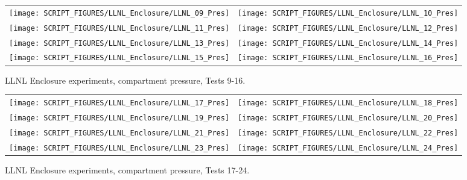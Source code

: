 \begin{figure}[p]
\begin{tabular*}{\textwidth}{l@{\extracolsep{\fill}}r}
\texttt{[image: SCRIPT\_FIGURES/LLNL\_Enclosure/LLNL\_09\_Pres]} &
\texttt{[image: SCRIPT\_FIGURES/LLNL\_Enclosure/LLNL\_10\_Pres]} \\
\texttt{[image: SCRIPT\_FIGURES/LLNL\_Enclosure/LLNL\_11\_Pres]} &
\texttt{[image: SCRIPT\_FIGURES/LLNL\_Enclosure/LLNL\_12\_Pres]} \\
\texttt{[image: SCRIPT\_FIGURES/LLNL\_Enclosure/LLNL\_13\_Pres]} &
\texttt{[image: SCRIPT\_FIGURES/LLNL\_Enclosure/LLNL\_14\_Pres]} \\
\texttt{[image: SCRIPT\_FIGURES/LLNL\_Enclosure/LLNL\_15\_Pres]} &
\texttt{[image: SCRIPT\_FIGURES/LLNL\_Enclosure/LLNL\_16\_Pres]}
\end{tabular*}
\caption{LLNL Enclosure experiments, compartment pressure, Tests 9-16.}
\label{LLNL_Enclosure_Pres_2}
\end{figure}

\begin{figure}[p]
\begin{tabular*}{\textwidth}{l@{\extracolsep{\fill}}r}
\texttt{[image: SCRIPT\_FIGURES/LLNL\_Enclosure/LLNL\_17\_Pres]} &
\texttt{[image: SCRIPT\_FIGURES/LLNL\_Enclosure/LLNL\_18\_Pres]} \\
\texttt{[image: SCRIPT\_FIGURES/LLNL\_Enclosure/LLNL\_19\_Pres]} &
\texttt{[image: SCRIPT\_FIGURES/LLNL\_Enclosure/LLNL\_20\_Pres]} \\
\texttt{[image: SCRIPT\_FIGURES/LLNL\_Enclosure/LLNL\_21\_Pres]} &
\texttt{[image: SCRIPT\_FIGURES/LLNL\_Enclosure/LLNL\_22\_Pres]} \\
\texttt{[image: SCRIPT\_FIGURES/LLNL\_Enclosure/LLNL\_23\_Pres]} &
\texttt{[image: SCRIPT\_FIGURES/LLNL\_Enclosure/LLNL\_24\_Pres]}
\end{tabular*}
\caption{LLNL Enclosure experiments, compartment pressure, Tests 17-24.}
\label{LLNL_Enclosure_Pres_3}
\end{figure}

